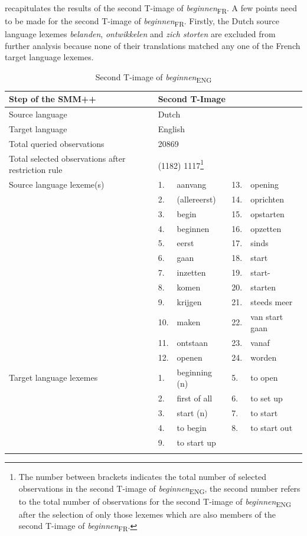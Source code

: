 recapitulates the results of the second T-image of \textit{beginnen}\textsubscript{FR}. A few points need to be made for the second T-image of \textit{beginnen}\textsubscript{FR}. Firstly, the Dutch source language lexemes \textit{belanden}, \textit{ontwikkelen} and \textit{zich storten} are excluded from further analysis because none of their translations matched any one of the French target language lexemes.\largerpage[-3]

\begin{table}[p]
\caption{Second T-image of \textit{beginnen}\textsubscript{ENG}\label{tab:3:10}}
\small
\begin{tabularx}{\textwidth}{p{}lXlX}
\lsptoprule
Step of the SMM++ & \multicolumn{4}{l}{Second T-Image}\\ \midrule
\rowcolor{lsLightGray} Source language & \multicolumn{4}{l}{Dutch}\\
Target language & \multicolumn{4}{l}{English}\\
\rowcolor{lsLightGray} Total queried observations & \multicolumn{4}{l}{20869}\\
Total selected observations after restriction rule  & \multicolumn{4}{l}{(1182) 1117\footnote{The number between brackets indicates the total number of selected observations in the second T-image of \textit{beginnen}\textsubscript{ENG}, the second number refers to the total number of observations for the second T-image of \textit{beginnen}\textsubscript{ENG} after the selection of only those lexemes which are also members of the second T-image of \textit{beginnen}\textsubscript{FR}.}}\\
\rowcolor{lsLightGray}Source language lexeme(s)  & 1.& aanvang & 13.& opening\\
\rowcolor{lsLightGray}& 2.& (allereerst) & 14.& oprichten\\
\rowcolor{lsLightGray}& 3.& begin & 15.& opstarten\\
\rowcolor{lsLightGray}& 4.& beginnen & 16.& opzetten\\
\rowcolor{lsLightGray}& 5.& eerst & 17.& sinds\\
\rowcolor{lsLightGray}& 6.& gaan & 18.& start\\
\rowcolor{lsLightGray}& 7.& inzetten & 19.& start-\\
\rowcolor{lsLightGray}& 8.& komen & 20.& starten\\
\rowcolor{lsLightGray}& 9.& krijgen & 21.& steeds meer\\
\rowcolor{lsLightGray}& 10.& maken & 22.& van start gaan\\
\rowcolor{lsLightGray}& 11.& ontstaan & 23.& vanaf\\
\rowcolor{lsLightGray}& 12.& openen & 24.& worden\\
Target language lexemes & 1. & beginning (n) & 5. & to open \\
&2. & first of all & 6. & to set up \\
&3. & start (n) & 7. & to start \\
&4. &to begin & 8. & to start out \\
&9. & to start up && \\
\lspbottomrule
\end{tabularx}
\end{table}
